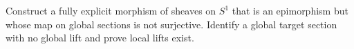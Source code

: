 \begin{problem}
Construct a fully explicit morphism of sheaves on $S^1$ that is an epimorphism but whose map on global sections is not surjective. Identify a global target section with no global lift and prove local lifts exist.
\end{problem}
